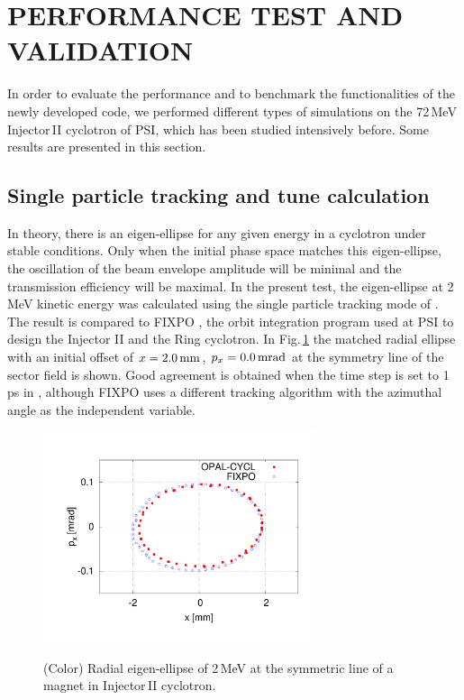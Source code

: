 \documentclass[aps,prstab,twocolumn,superscriptaddress,showpacs]{revtex4}
\begin{document}
\section{PERFORMANCE TEST AND VALIDATION}
In order to evaluate the performance and to benchmark the functionalities of the newly developed code, we performed different types of simulations on
 the 72\,MeV Injector\,II cyclotron of PSI, which has been studied intensively before. Some results are presented in this section. 

\subsection{Single particle tracking and tune calculation}
In theory, there is an eigen-ellipse for any given energy in a cyclotron under stable conditions. Only when the initial phase space
matches this eigen-ellipse, the oscillation of the beam envelope amplitude will be minimal and the transmission efficiency will be maximal.
In the present test, the eigen-ellipse at 2\,MeV kinetic energy was calculated using the single particle tracking mode of \opalcycl.  
The result is compared to FIXPO \cite{FIXPO:1,joho:2}, the orbit integration program used at PSI to design the Injector II and the Ring cyclotron.
In Fig.\,\ref{fig:Eigen} the matched radial ellipse with an initial offset of $x=2.0{\RM{\,mm}}$, $p_x=0.0{\RM{\,mrad}}$ at the symmetry line of the sector field is shown.
Good agreement is obtained when the time step is set to 1\,ps in \opalcycl, although FIXPO uses a different tracking algorithm with the azimuthal angle as
the independent variable.
\begin{figure}
  {\includegraphics[width=8cm,trim=2.5cm 2.5cm 2.5cm 2.5cm]{figures/RadialEigen_Inj2.pdf}}
  \caption{(Color) Radial eigen-ellipse of 2\,MeV at the symmetric line of a magnet in Injector\,II cyclotron.}
  \label{fig:Eigen}
\end{figure}
\end{document}
